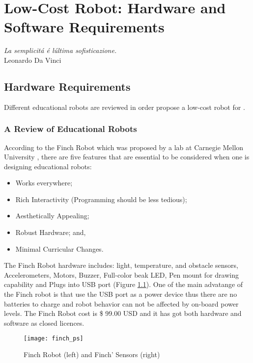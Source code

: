 \chapter{Low-Cost Robot: Hardware and Software Requirements}
\graphicspath{{Chapter2/Figs/}{Chapter2/Figs/}}

    
\vspace{10mm}
\footnotesize {
\begin{flushright}
\textit{
La semplicit\'a \'e l\'ultima sofisticazione.
}\\
Leonardo Da Vinci
\end{flushright}
}
\vspace{10mm}

\section{Hardware Requirements}
Different educational robots are reviewed in order propose a low-cost robot for {\librER}.
\subsection{A Review of Educational Robots}
According to the Finch Robot which was proposed by a lab at Carnegie Mellon University
\cite{finchrobot2014}, there are five features that are essential
to be considered when one is designing educational robots:
\begin{itemize}[noitemsep,topsep=0pt,parsep=0pt,partopsep=0pt]
 \item Works everywhere;
 \item Rich Interactivity (Programming should be less tedious);
 \item Aesthetically Appealing;
 \item Robust Hardware; and,
 \item Minimal Curricular Changes.
 \end{itemize}
 The Finch Robot hardware includes: light, temperature, and obstacle sensors,
 Accelerometers, Motors, Buzzer, Full-color beak LED, 
 Pen mount for drawing capability and Plugs into USB port (Figure \ref{fig:finch}).
 One of the main advatange of the Finch robot is that use the USB port as a power
device thus there are no batteries to charge and robot behavior can not be affected
by on-board power levels. The Finch Robot cost is \$ 99.00 USD and it has got both 
hardware and software as closed licences.
\begin{figure}[htbp!] 
\centering    
\texttt{[image: finch\_ps]}
\caption[PA]{Finch Robot (left) and Finch' Sensors (right)}
\label{fig:finch}
\end{figure}


